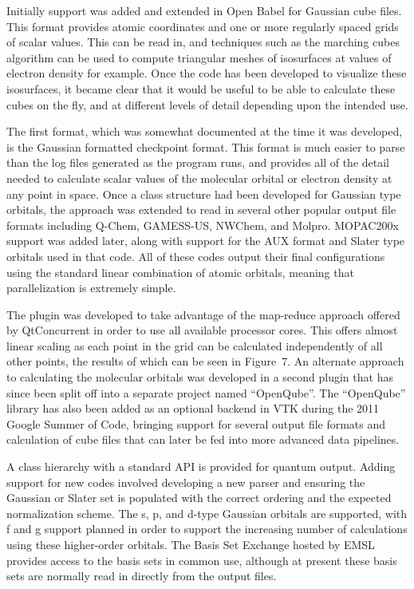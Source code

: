 \documentclass[10pt]{bmc_article}
\newenvironment{bmcformat}{\begin{raggedright}
  \baselineskip20pt\sloppy\setboolean{publ}{false}}{\end{raggedright}
  \baselineskip20pt\sloppy}
\begin{document}
\begin{bmcformat}
Initially support was added and extended in Open Babel for Gaussian cube files.
This format provides atomic coordinates and one or more regularly spaced grids
of scalar values. This can be read in, and techniques such as the marching cubes
algorithm can be used to compute triangular meshes of isosurfaces at values of
electron density for example. Once the code has been developed to visualize these
isosurfaces, it became clear that it would be useful to be able to calculate these cubes
on the fly, and at different levels of detail depending upon the intended use.

The first format, which was somewhat documented at the time it was developed, is the
Gaussian formatted checkpoint format. This format is much easier to parse than the
log files generated as the program runs, and provides all of the detail needed to
calculate scalar values of the molecular orbital or electron density at any point in space.
Once a class structure had been developed for Gaussian type orbitals, the approach
was extended to read in several other popular output file formats including Q-Chem,
GAMESS-US, NWChem, and Molpro. MOPAC200x support was added later, along with
support for the AUX format and Slater type orbitals used in that code. All of these
codes output their final configurations using the standard linear combination of
atomic orbitals, meaning that parallelization is extremely simple.

The plugin was developed to take advantage of the map-reduce approach offered
by QtConcurrent in order to use all available processor cores. This offers almost
linear scaling as each point in the grid can be calculated independently of all other
points, the results of which can be seen in Figure~7.
An alternate approach to calculating the molecular orbitals was developed
in a second plugin that has since been split off into a separate
project named ``OpenQube''. The ``OpenQube'' library has also been added as an
optional backend in VTK during the 2011 Google Summer of Code, bringing support
for several output file formats and calculation of cube files that can later be
fed into more advanced data pipelines.

A class hierarchy with a standard API is provided for quantum output. Adding
support for new codes involved developing a new parser and ensuring the
Gaussian or Slater set is populated with the correct ordering and the expected
normalization scheme. The s, p, and d-type Gaussian orbitals are supported,
with f and g support planned in order to support the increasing number of
calculations using these higher-order orbitals. The Basis Set Exchange hosted
by EMSL provides access to the basis sets in common use, although at present
these basis sets are normally read in directly from the output files.


\end{bmcformat}
\end{document}

